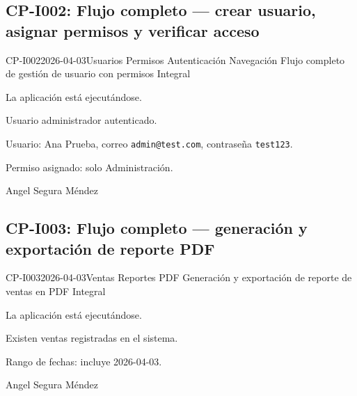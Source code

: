 \subsection{CP-I002: Flujo completo --- crear usuario, asignar permisos y verificar acceso}
\def\cpPasos{%
  \item Navegar a ``Usuarios'' \arr{} crear nuevo usuario con los datos indicados.
  \item Asignar solo permiso ``Administración''.
  \item Guardar usuario.
  \item Cerrar sesión.
  \item Iniciar sesión con \texttt{admin@test.com / test123}.
  \item Verificar módulos disponibles en el menú.}
\def\cpResultadoE{%
  \item Menú muestra solo módulos administrativos.
  \item No muestra Ventas, Estadísticas ni Reportes.}
\def\cpResultadoO{El menú mostró exactamente 7 módulos: Inicio, Productos, Categorías,
  Emprendimientos, Emprendedoras, Actividades y Asociación. Los módulos de ventas no
  aparecieron. El sistema aplicó correctamente los permisos asignados.}
\casoprueba
  {CP-I002}{2026-04-03}{Usuarios \arr{} Permisos \arr{} Autenticación \arr{} Navegación}
  {Flujo completo de gestión de usuario con permisos}
  {Integral}{\estadoAprobado}
  {\item La aplicación está ejecutándose.
   \item Usuario administrador autenticado.}
  {\item Usuario: Ana Prueba, correo \texttt{admin@test.com}, contraseña \texttt{test123}.
   \item Permiso asignado: solo Administración.}
  {Angel Segura Méndez}

\subsection{CP-I003: Flujo completo --- generación y exportación de reporte PDF}
\def\cpPasos{%
  \item Navegar a ``Reportes''.
  \item Seleccionar rango de fechas que incluya hoy.
  \item Generar el reporte.
  \item Exportar a PDF.}
\def\cpResultadoE{%
  \item El PDF se genera correctamente con los datos de ventas del período.}
\def\cpResultadoO{El reporte se generó y el PDF se exportó correctamente.}
\casoprueba
  {CP-I003}{2026-04-03}{Ventas \arr{} Reportes \arr{} PDF}
  {Generación y exportación de reporte de ventas en PDF}
  {Integral}{\estadoAprobado}
  {\item La aplicación está ejecutándose.
   \item Existen ventas registradas en el sistema.}
  {\item Rango de fechas: incluye 2026-04-03.}
  {Angel Segura Méndez}

